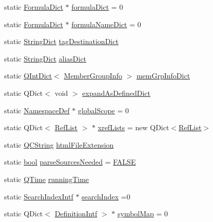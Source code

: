 \begin{DoxyCompactItemize}
\item 
static \hyperlink{class_formula_dict}{Formula\+Dict} $\ast$ \hyperlink{class_doxygen_a9d1da6dc45ebbe915e411c5282b648b2}{formula\+Dict} = 0
\item 
static \hyperlink{class_formula_dict}{Formula\+Dict} $\ast$ \hyperlink{class_doxygen_a76cbdd291a661c0e4f7a060a198c6adb}{formula\+Name\+Dict} = 0
\item 
static \hyperlink{class_string_dict}{String\+Dict} \hyperlink{class_doxygen_a88e47b2392d8845dfb569e4eb56672d4}{tag\+Destination\+Dict}
\item 
static \hyperlink{class_string_dict}{String\+Dict} \hyperlink{class_doxygen_a2699fd682e95cf491bcd66624be0aa0b}{alias\+Dict}
\item 
static \hyperlink{class_q_int_dict}{Q\+Int\+Dict}$<$ \hyperlink{struct_member_group_info}{Member\+Group\+Info} $>$ \hyperlink{class_doxygen_af1fc60f2ca0c90aabbbd1184bf0c05d3}{mem\+Grp\+Info\+Dict}
\item 
static Q\+Dict$<$ void $>$ \hyperlink{class_doxygen_a396feff53760d374441739ec6a5f002a}{expand\+As\+Defined\+Dict}
\item 
static \hyperlink{class_namespace_def}{Namespace\+Def} $\ast$ \hyperlink{class_doxygen_a24ab2a65644e423b09020f9e63d250bd}{global\+Scope} = 0
\item 
static Q\+Dict$<$ \hyperlink{class_ref_list}{Ref\+List} $>$ $\ast$ \hyperlink{class_doxygen_a645b82fe7debf260fbedd01c59e3bb87}{xref\+Lists} = new Q\+Dict$<$\hyperlink{class_ref_list}{Ref\+List}$>$
\item 
static \hyperlink{class_q_c_string}{Q\+C\+String} \hyperlink{class_doxygen_aa98afe79970170f82848bc45b0f076ec}{html\+File\+Extension}
\item 
static \hyperlink{qglobal_8h_a1062901a7428fdd9c7f180f5e01ea056}{bool} \hyperlink{class_doxygen_a19687ee2473747b1c587aa6c033daa6c}{parse\+Sources\+Needed} = \hyperlink{qglobal_8h_a10e004b6916e78ff4ea8379be80b80cc}{F\+A\+L\+S\+E}
\item 
static \hyperlink{class_q_time}{Q\+Time} \hyperlink{class_doxygen_a1a243328345698e4fef76a5b6d4db5ee}{running\+Time}
\item 
static \hyperlink{class_search_index_intf}{Search\+Index\+Intf} $\ast$ \hyperlink{class_doxygen_a806fe73b71f926356bf12291778769b6}{search\+Index} =0
\item 
static Q\+Dict$<$ \hyperlink{class_definition_intf}{Definition\+Intf} $>$ $\ast$ \hyperlink{class_doxygen_a089679b41a1b70f299d653312097f879}{symbol\+Map} = 0
\item 

\end{DoxyCompactItemize}
